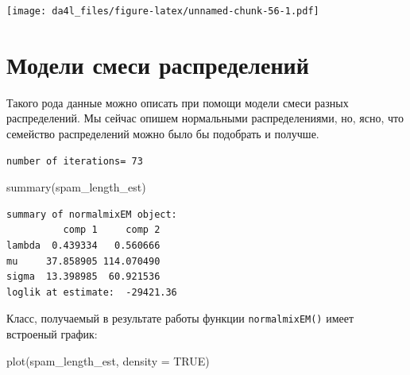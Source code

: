 \documentclass[
]{book}
\newenvironment{Shaded}{\begin{snugshade}}{\end{snugshade}}
\newcommand{\AttributeTok}[1]{\textcolor[rgb]{0.77,0.63,0.00}{#1}}
\newcommand{\ConstantTok}[1]{\textcolor[rgb]{0.00,0.00,0.00}{#1}}
\newcommand{\DecValTok}[1]{\textcolor[rgb]{0.00,0.00,0.81}{#1}}
\newcommand{\FunctionTok}[1]{\textcolor[rgb]{0.00,0.00,0.00}{#1}}
\newcommand{\NormalTok}[1]{#1}
\newcommand{\OtherTok}[1]{\textcolor[rgb]{0.56,0.35,0.01}{#1}}
\newcommand{\SpecialCharTok}[1]{\textcolor[rgb]{0.00,0.00,0.00}{#1}}
\begin{document}
\texttt{[image: da4l\_files/figure-latex/unnamed-chunk-56-1.pdf]}

\hypertarget{ux43cux43eux434ux435ux43bux438-ux441ux43cux435ux441ux438-ux440ux430ux441ux43fux440ux435ux434ux435ux43bux435ux43dux438ux439-1}{%
\section{Модели смеси распределений}\label{ux43cux43eux434ux435ux43bux438-ux441ux43cux435ux441ux438-ux440ux430ux441ux43fux440ux435ux434ux435ux43bux435ux43dux438ux439-1}}

Такого рода данные можно описать при помощи модели смеси разных распределений. Мы сейчас опишем нормальными распределениями, но, ясно, что семейство распределений можно было бы подобрать и получше.

\begin{Shaded}
\end{Shaded}

\begin{verbatim}
number of iterations= 73 
\end{verbatim}

\begin{Shaded}
\begin{Highlighting}[]
\FunctionTok{summary}\NormalTok{(spam\_length\_est)}
\end{Highlighting}
\end{Shaded}

\begin{verbatim}
summary of normalmixEM object:
          comp 1     comp 2
lambda  0.439334   0.560666
mu     37.858905 114.070490
sigma  13.398985  60.921536
loglik at estimate:  -29421.36 
\end{verbatim}

Класс, получаемый в результате работы функции \texttt{normalmixEM()} имеет встроеный график:

\begin{Shaded}
\begin{Highlighting}[]
\FunctionTok{plot}\NormalTok{(spam\_length\_est, }\AttributeTok{density =} \ConstantTok{TRUE}\NormalTok{)}
\end{Highlighting}
\end{Shaded}
\end{document}

